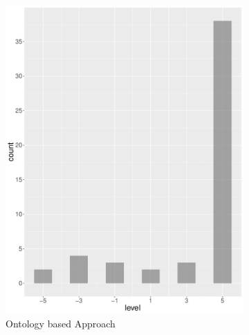 \begin{figure}
    \centering
    \begin{subfigure}[b]{0.4\textwidth}
        \includegraphics[width=\textwidth]{plots/tennis/hist_level_nn}
        \caption{Ontology based Approach}
        \label{fig:hist_level_tennis_nn}
    \end{subfigure}
    ~
    \begin{subfigure}[b]{0.4\textwidth}

\end{subfigure}
\end{figure}
